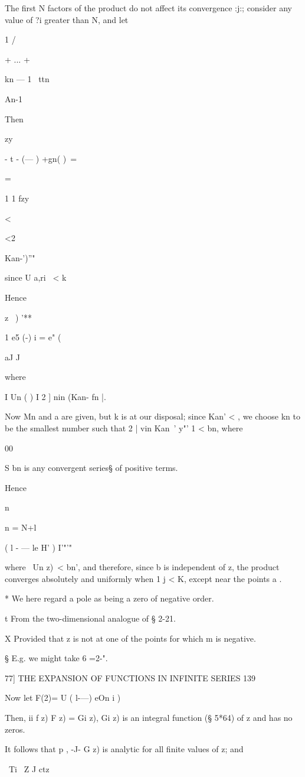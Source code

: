 The first N factors of the product do not affect its convergence :j:;
consider any value of ?i greater than N, and let

1 /

+ ... +

kn — 1 \ ttn

An-1

Then

zy

- t - (— ) +gn( )\ =

=

1 1 fzy

<

<2\ \ {Kan-')''"\,

since U a,ri \ < k

Hence

z \ ) '**

1 e5 (-) i = e" (

aJ J

where

I Un ( ) I 2 ] nin (Kan- fn |.

Now Mn and a are given, but k is at our disposal; since Kan' < , we
choose kn to be the smallest number such that 2 | vin Kan~' y"' 1 <
bn, where

00

S bn is any convergent series§ of positive terms.

Hence

n

n = N+l

 ( l - — le H' ) I'"'"

where \ Un z)\ < bn', and therefore, since b is independent of z, the
product converges absolutely and uniformly when 1 j < K, except near
the points a .

* We here regard a pole as being a zero of negative order.

t From the two-dimensional analogue of § 2-21.

X Provided that z is not at one of the points for which m is negative.

§ E.g. we might take 6 =2-".

77] THE EXPANSION OF FUNCTIONS IN INFINITE SERIES 139

Now let F(2)= U ( l-—) eOn i )

Then, ii f z) F z) = Gi z), Gi z) is an integral function (§ 5*64) of
z and has no zeros.

It follows that p , -J- G z) is analytic for all finite values of z;
and

\ Ti \ Z J ctz

}
